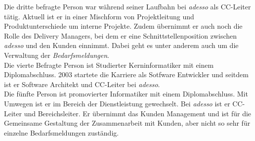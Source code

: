 Die dritte befragte Person war während seiner Laufbahn bei \emph{adesso} als CC-Leiter tätig. Aktuell ist er in einer Mischform von Projektleitung und Produktunterschiede um interne Projekte. Zudem übernimmt er auch noch die Rolle des Delivery Managers, bei dem er eine Schnittstellenposition zwischen \emph{adesso} und den Kunden einnimmt. Dabei geht es unter anderem auch um die Verwaltung der \emph{Bedarfsmeldungen}.\\

Die vierte Befragte Person ist Studierter Kerninformatiker mit einem Diplomabschluss. 2003 startete die Karriere als Sotfware Entwickler und seitdem ist er Software Architekt und CC-Leiter bei \emph{adesso}.\\

Die fünfte Person ist promovierter Informatiker mit einem Diplomabschluss. Mit Umwegen ist er im Bereich der Dienstleistung gewechselt. Bei \emph{adesso} ist er CC-Leiter und Bereichsleiter. Er übernimmt das Kunden Management und ist für die Gemeinsame Gestaltung der Zusammenarbeit mit Kunden, aber nicht so sehr für einzelne Bedarfsmeldungen zuständig.\\








